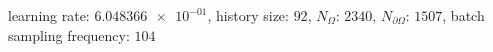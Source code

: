 learning rate: $\num[scientific-notation=true]{6.048366e-01}$, history size: $\num[scientific-notation=false]{92}$, $N_{\Omega}$: $\num[scientific-notation=false]{2340}$, $N_{\partial\Omega}$: $\num[scientific-notation=false]{1507}$, batch sampling frequency: $\num[scientific-notation=false]{104}$